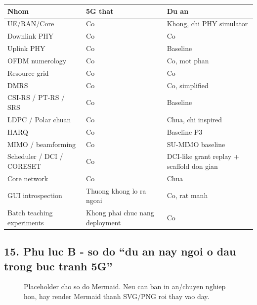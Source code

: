 \documentclass[
  vietnamese,
  a4paper,
  11pt]{article}
\newcounter{none} %
\begin{document}
{\def\LTcaptype{none} %
\begin{longtable}[]{@{}lll@{}}
\toprule\noalign{}
Nhom & 5G that & Du an \\
\midrule\noalign{}
\endhead
\bottomrule\noalign{}
\endlastfoot
UE/RAN/Core & Co & Khong, chi PHY simulator \\
Downlink PHY & Co & Co \\
Uplink PHY & Co & Baseline \\
OFDM numerology & Co & Co, mot phan \\
Resource grid & Co & Co \\
DMRS & Co & Co, simplified \\
CSI-RS / PT-RS / SRS & Co & Baseline \\
LDPC / Polar chuan & Co & Chua, chi inspired \\
HARQ & Co & Baseline P3 \\
MIMO / beamforming & Co & SU-MIMO baseline \\
Scheduler / DCI / CORESET & Co & DCI-like grant replay + scaffold don
gian \\
Core network & Co & Chua \\
GUI introspection & Thuong khong lo ra ngoai & Co, rat manh \\
Batch teaching experiments & Khong phai chuc nang deployment & Co \\
\end{longtable}
}

\subsection{15. Phu luc B - so do ``du an nay ngoi o dau trong buc tranh
5G''}\label{phu-luc-b---so-do-du-an-nay-ngoi-o-dau-trong-buc-tranh-5g}

\begin{figure}[H]
\centering
{}
\caption{Placeholder cho so do Mermaid. Neu can ban in an/chuyen nghiep hon, hay render Mermaid thanh SVG/PNG roi thay vao day.}
\end{figure}
\end{document}
